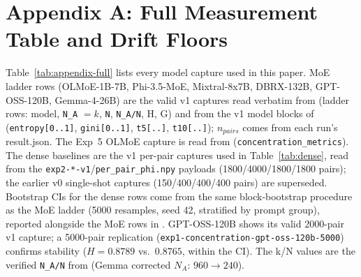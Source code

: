 \documentclass[sigconf]{acmart}
\begin{document}
\clearpage

\section*{Appendix A: Full Measurement Table and Drift Floors}
\label{app:fulltable}

Table~\ref{tab:appendix-full} lists every model capture used in this paper.
MoE ladder rows (OLMoE-1B-7B, Phi-3.5-MoE, Mixtral-8x7B, DBRX-132B,
GPT-OSS-120B, Gemma-4-26B) are the valid v1 captures read verbatim from
 (ladder rows: model,
\texttt{N\_A} $=k$, \texttt{N}, \texttt{N\_A/N}, H, G) and from the v1 model
blocks of 
(\texttt{entropy[0..1]}, \texttt{gini[0..1]}, \texttt{t5[..]},
\texttt{t10[..]}); $n_{pairs}$ comes from each run's result.json. The Exp~5
OLMoE capture is read from
(\texttt{concentration\_metrics}). The dense baselines are the v1
per-pair captures used in Table~\ref{tab:dense}, read from the
\texttt{exp2-*-v1}/\texttt{per\_pair\_phi.npy} payloads
(1800/4000/1800/1800 pairs); the earlier v0 single-shot captures
(150/400/400/400 pairs) are superseded. Bootstrap CIs for the dense rows come
from the same block-bootstrap procedure as the MoE ladder (5000 resamples,
seed 42, stratified by prompt group), reported alongside the MoE rows in
. GPT-OSS-120B shows its
valid 2000-pair v1 capture; a 5000-pair replication
(\texttt{exp1-concentration-gpt-oss-120b-5000}) confirms stability
($H=0.8789$ vs.\ $0.8765$, within the CI). The k/N values are the verified
\texttt{N\_A/N} from  (Gemma corrected
$N_A$: $960 \rightarrow 240$).
\end{document}

